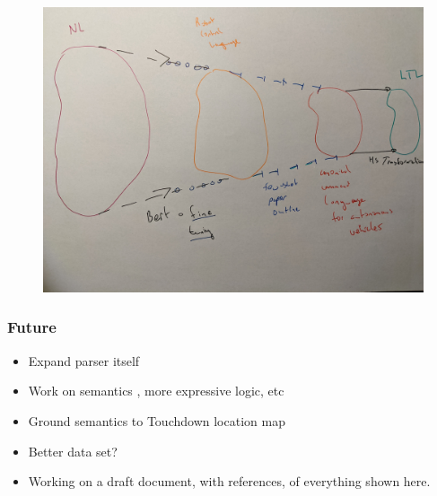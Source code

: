 \documentclass{beamer}
\begin{document}
\begin{frame}
\frametitle{}
\begin{figure}
\hspace*{-3mm}%
   \includegraphics[width= \paperwidth]{pics/three.jpg}
\end{figure}
\end{frame}

\begin{frame}
\frametitle{Future}

\begin{itemize} 
\item Expand parser itself
\item Work on semantics , more expressive logic, etc
\item Ground semantics to Touchdown location map
\item Better data set?
\item Working on a draft document, with references, of everything shown here.
\end{itemize} 

\end{frame}
\end{document}
